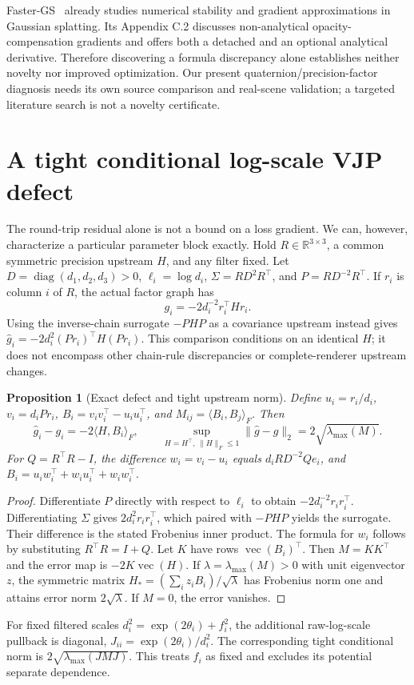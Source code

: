 \documentclass[11pt,a4paper]{article}
\newtheorem{proposition}[theorem]{Proposition}
\newcommand{\R}{\mathbb{R}}
\begin{document}
Faster-GS~\cite{fastergs} already studies numerical stability and
gradient approximations in Gaussian splatting. Its Appendix C.2
discusses non-analytical opacity-compensation gradients and offers
both a detached and an optional analytical derivative. Therefore
discovering a formula discrepancy alone establishes neither novelty
nor improved optimization. Our present quaternion/precision-factor
diagnosis needs its own source comparison and real-scene validation;
a targeted literature search is not a novelty certificate.

\section{A tight conditional log-scale VJP defect}
The round-trip residual alone is not a bound on a loss gradient.
We can, however, characterize a particular parameter block exactly.
Hold $R\in\R^{3\times3}$, a common symmetric precision upstream $H$,
and any filter fixed. Let $D=\operatorname{diag}(d_1,d_2,d_3)>0$,
$\ell_i=\log d_i$, $\Sigma=RD^2R^\top$, and $P=RD^{-2}R^\top$.
If $r_i$ is column $i$ of $R$, the actual factor graph has
\[
 g_i=-2d_i^{-2}r_i^\top H r_i.
\]
Using the inverse-chain surrogate $-PHP$ as a covariance upstream instead
gives $\widehat g_i=-2d_i^2(Pr_i)^\top H(Pr_i)$.
This comparison conditions on an identical $H$; it does not encompass
other chain-rule discrepancies or complete-renderer upstream changes.

\begin{proposition}[Exact defect and tight upstream norm]
Define $u_i=r_i/d_i$, $v_i=d_iPr_i$, $B_i=v_iv_i^\top-u_iu_i^\top$,
and $M_{ij}=\langle B_i,B_j\rangle_F$. Then
\[
 \widehat g_i-g_i=-2\langle H,B_i\rangle_F,
 \qquad
 \sup_{H=H^\top,\,\|H\|_F\le1}
 \|\widehat g-g\|_2=2\sqrt{\lambda_{\max}(M)}.
\]
For $Q=R^\top R-I$, the difference $w_i=v_i-u_i$ equals
$d_iRD^{-2}Qe_i$, and
$B_i=u_iw_i^\top+w_iu_i^\top+w_iw_i^\top$.
\end{proposition}
\begin{proof}
Differentiate $P$ directly with respect to $\ell_i$ to obtain
$-2d_i^{-2}r_ir_i^\top$. Differentiating $\Sigma$ gives
$2d_i^2r_ir_i^\top$, which paired with $-PHP$ yields the surrogate.
Their difference is the stated Frobenius inner product. The formula
for $w_i$ follows by substituting $R^\top R=I+Q$.
Let $K$ have rows $\operatorname{vec}(B_i)^\top$. Then $M=KK^\top$
and the error map is $-2K\operatorname{vec}(H)$.
If $\lambda=\lambda_{\max}(M)>0$ with unit eigenvector $z$, the symmetric
matrix $H_*=(\sum_i z_iB_i)/\sqrt\lambda$ has Frobenius norm one and
attains error norm $2\sqrt\lambda$. If $M=0$, the error vanishes.
\end{proof}
For fixed filtered scales $d_i^2=\exp(2\theta_i)+f_i^2$, the additional
raw-log-scale pullback is diagonal, $J_{ii}=\exp(2\theta_i)/d_i^2$.
The corresponding tight conditional norm is $2\sqrt{\lambda_{\max}(JMJ)}$.
This treats $f_i$ as fixed and excludes its potential separate dependence.
\end{document}
